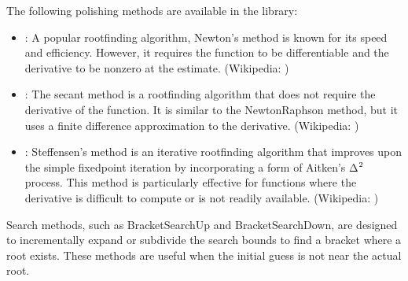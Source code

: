 \documentclass[letterpaper,10pt,english]{sphinxmanual}
\begin{document}
\sphinxAtStartPar
The following polishing methods are available in the library:
\begin{itemize}
\item {} 
\sphinxAtStartPar
{}: A popular root\sphinxhyphen{}finding algorithm, Newton’s method is known for its speed and efficiency. However, it requires the function to be differentiable and the derivative to be non\sphinxhyphen{}zero at the estimate. (Wikipedia: )

\item {} 
\sphinxAtStartPar
{}: The secant method is a root\sphinxhyphen{}finding algorithm that does not require the derivative of the function. It is similar to the Newton\sphinxhyphen{}Raphson method, but it uses a finite difference approximation to the derivative. (Wikipedia: )

\item {} 
\sphinxAtStartPar
{}: Steffensen’s method is an iterative root\sphinxhyphen{}finding algorithm that improves upon the simple fixed\sphinxhyphen{}point iteration by incorporating a form of Aitken’s Δ\(\sp{\text{2}}\) process. This method is particularly effective for functions where the derivative is difficult to compute or is not readily available. (Wikipedia: )

\end{itemize}

\sphinxAtStartPar
Search methods, such as BracketSearchUp and BracketSearchDown, are designed to incrementally expand or subdivide the search bounds to find a bracket where a root exists. These methods are useful when the initial guess is not near the actual root.
\end{document}
